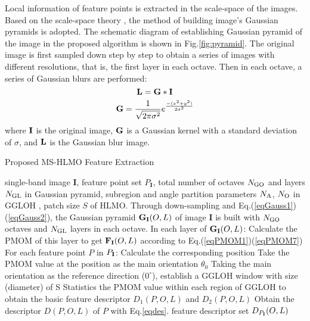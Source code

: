 Local information of feature points is extracted in the scale-space of the images. Based on the scale-space theory \cite{lindeberg1994scale}, the method of building image's Gaussian pyramids is adopted. The schematic diagram of establishing Gaussian pyramid of the image in the proposed algorithm is shown in Fig.\ref{fig:pyramid}. The original image is first sampled down step by step to obtain a series of images with different resolutions, that is, the first layer in each octave. Then in each octave, a series of Gaussian blurs are performed:
\begin{equation}\label{eqGauss1}
{\bf{L}} = {\bf{G}} * {\bf{I}}
\end{equation}
\begin{equation}\label{eqGauss2}
{\bf{G}} = \frac{1}{{\sqrt {2\pi {\sigma ^2}} }}{e^{\frac{{-({x^2} + {y^2})}}{{2{\sigma ^2}}}}}
\end{equation}
where ${\bf{I}}$ is the original image, ${\bf{G}}$ is a Gaussian kernel with a standard deviation of $\sigma$, and ${\bf{L}}$ is the Gaussian blur image.

\begin{algorithm}[htp]
\caption{\label{multi1} \footnotesize Proposed MS-HLMO Feature Extraction}
\begin{algorithmic}
\footnotesize
{} single-band image $\mathbf{I}$, feature point set $P_{\mathbf{I}}$, total number of octaves ${N_{\rm{GO}}}$ and layers ${N_{\rm{GL}}}$ in Gaussian pyramid, subregion and angle partition parameters ${N_{\rm{A}}}$, ${N_{\rm{O}}}$ in GGLOH , patch size $S$ of HLMO.
\STATE Through down-sampling and Eq.(\ref{eqGauss1})(\ref{eqGauss2}), the Gaussian pyramid ${\bf{G}}_{\bf{I}}(O,L)$ of image $\mathbf{I}$ is built with ${N_{\rm{GO}}}$ octaves and ${N_{\rm{GL}}}$ layers in each octave.
\STATE In each layer of ${\bf{G}}_{\bf{I}}(O,L)$:
\STATE \hspace*{0.1in}Calculate the PMOM of this layer to get ${\bf{F}}_{\bf{I}}(O,L)$ according to Eq.(\ref{eqPMOM1})(\ref{eqPMOM7})
\STATE \hspace*{0.1in}For each feature point $P$ in $P_{\bf{I}}$:
\STATE \hspace*{0.2in}Calculate the corresponding position
\STATE \hspace*{0.2in}Take the PMOM value at the position as the main orientation ${\theta_0}$
\STATE \hspace*{0.2in}Taking the main orientation as the reference direction ($0^{\circ}$), establish a GGLOH window with size (diameter) of S
\STATE \hspace*{0.2in}Statistics the PMOM value within each region of GGLOH to obtain the basic feature descriptor $D_{1}(P,O,L)$ and $D_{2}(P,O,L)$
\STATE \hspace*{0.2in}Obtain the descriptor $D(P,O,L)$ of $P$ with Eq.\ref{eqdes}.
 feature descriptor set $D_{P_{\bf{I}}}(O,L)$
\end{algorithmic}
\end{algorithm}

